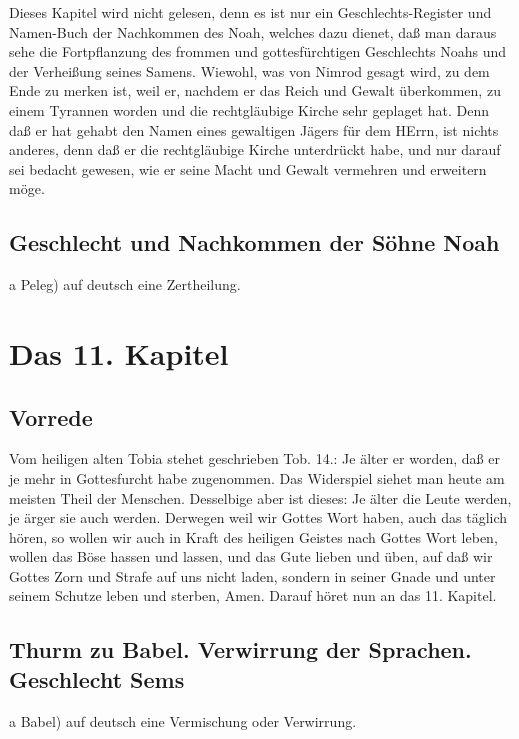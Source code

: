Dieses Kapitel wird nicht gelesen, denn es ist nur ein Geschlechts-Register und Namen-Buch der Nachkommen des Noah, welches dazu dienet, daß man daraus sehe die Fortpflanzung des frommen und gottesfürchtigen Geschlechts Noahs und der Verheißung seines Samens. Wiewohl, was von Nimrod gesagt wird, zu dem Ende zu merken ist, weil er, nachdem er das Reich und Gewalt überkommen, zu einem Tyrannen worden und die rechtgläubige Kirche sehr geplaget hat. Denn daß er hat gehabt den Namen eines gewaltigen Jägers für dem HErrn, ist nichts anderes, denn daß er die rechtgläubige Kirche unterdrückt habe, und nur darauf sei bedacht gewesen, wie er seine Macht und Gewalt vermehren und erweitern möge.

\section{Geschlecht und Nachkommen der Söhne Noah}

a Peleg) auf deutsch eine Zertheilung.

\chapter{Das 11. Kapitel}

\section{Vorrede}

Vom heiligen alten Tobia stehet geschrieben Tob. 14.: Je älter er worden, daß er je mehr in Gottesfurcht habe zugenommen. Das Widerspiel siehet man heute am meisten Theil der Menschen. Desselbige aber ist dieses: Je älter die Leute werden, je ärger sie auch werden. Derwegen weil wir Gottes Wort haben, auch das täglich hören, so wollen wir auch in Kraft des heiligen Geistes nach Gottes Wort leben, wollen das Böse hassen und lassen, und das Gute lieben und üben, auf daß wir Gottes Zorn und Strafe auf uns nicht laden, sondern in seiner Gnade und unter seinem Schutze leben und sterben, Amen. Darauf höret nun an das 11. Kapitel.

\section{Thurm zu Babel. Verwirrung der Sprachen. Geschlecht Sems}



a Babel) auf deutsch eine Vermischung oder Verwirrung.







